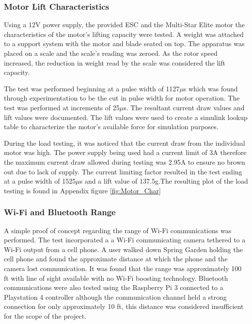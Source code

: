  \subsubsection{Motor Lift Characteristics}
 
 Using a 12V power supply, the provided ESC and the Multi-Star Elite motor the characteristics of the motor's lifting capacity were tested. A weight was attached to a support system with the motor and blade seated on top. The apparatus was placed on a scale and the scale's reading was zeroed. As the rotor speed increased, the reduction in weight read by the scale was considered the lift capacity.
 
 The test was performed beginning at a pulse width of 1127$\mu$s which was found through experimentation to be the cut in pulse width for motor operation. The test was performed at increments of 25$\mu$s. The resultant current draw values and lift values were documented. The lift values were used to create a simulink lookup table to characterize the motor's available force for simulation purposes. 
 
 During the load testing, it was noticed that the current draw from the individual motor was high. The power supply being used had a current limit of 3A therefore the maximum current draw allowed during testing was 2.95A to ensure no brown out due to lack of supply. The current limiting factor resulted in the test ending at a pulse width of 1525$\mu$s and a lift value of 137.5g.The resulting plot of the load testing is found in Appendix figure \ref{fig:Motor_Char}

  \subsubsection{Wi-Fi and Bluetooth Range}
  
  A simple proof of concept regarding the range of Wi-Fi communications was performed. The test incorporated a a Wi-Fi communicating camera tethered to a Wi-Fi output from a cell phone. A user walked down Spring Garden holding the cell phone and found the approximate distance at which the phone and the camera lost communication. It was found that the range was approximately 100 ft with line of sight available with no Wi-Fi boosting technology. Bluetooth communications were also tested using the Raspberry Pi 3 connected to a Playstation 4 controller although the communication channel held a strong connection for only approximately 10 ft, this distance was considered insufficient for the scope of the project.
  
